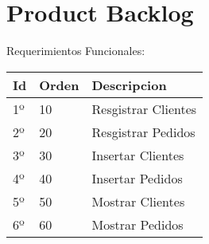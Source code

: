 \chapter{Product Backlog}

Requerimientos Funcionales:

\begin{table}[htbp]
	\begin{center}
		\begin{tabular}{| p{3.2cm}| p{4.2cm} |p{5.2cm} |}
			\hline
			\textbf{Id} & \textbf {Orden} & \textbf{Descripcion} \\\hline	
			1º & 10 & Resgistrar Clientes\\ \hline
			2º & 20 & Resgistrar Pedidos\\ \hline
			3º & 30 & Insertar Clientes\\ \hline
			4º & 40 & Insertar Pedidos\\ \hline
			5º & 50 & Mostrar Clientes\\ \hline
			6º & 60 & Mostrar Pedidos\\ \hline
		\end{tabular}
	\end{center}
\end{table}
